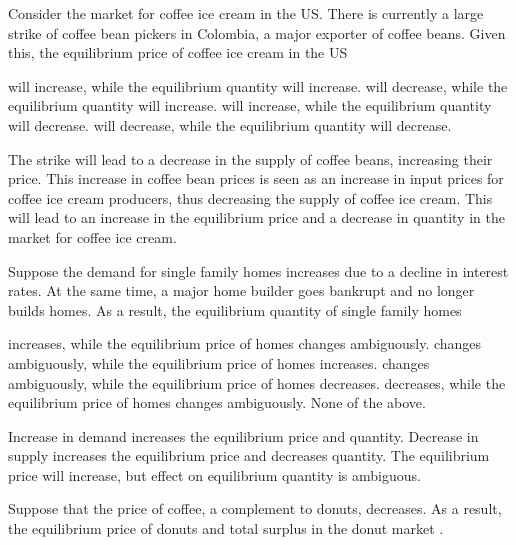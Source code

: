 \documentclass[addpoints,11pt]{exam}
\theoremstyle{definition}
\newcommand{\blank}[0]{\underline{\hspace{3cm}}}
\begin{document}
\begin{questions}
	\question Consider the market for coffee ice cream in the US. There is currently a large strike of coffee bean pickers in Colombia, a major exporter of coffee beans. Given this, the equilibrium price of coffee ice cream in the US
	
	\begin{choices}
		\choice will increase, while the equilibrium quantity will increase.
		\choice will decrease, while the equilibrium quantity will increase.
		\CorrectChoice will increase, while the equilibrium quantity will decrease.
		\choice will decrease, while the equilibrium quantity will decrease.
	\end{choices}
	
	\begin{solution}
		The strike will lead to a decrease in the supply of coffee beans, increasing their price. This increase in coffee bean prices is seen as an increase in input prices for coffee ice cream producers, thus decreasing the supply of coffee ice cream. This will lead to an increase in the equilibrium price and a decrease in quantity in the market for coffee ice cream.
	\end{solution}
			
		\question Suppose the demand for single family homes increases due to a decline in interest rates. At the same time, a major home builder goes bankrupt and no longer builds homes. As a result, the equilibrium quantity of single family homes
		
		\begin{choices}
			\choice increases, while the equilibrium price of homes changes ambiguously.
			\CorrectChoice changes ambiguously, while the equilibrium price of homes increases.
			\choice changes ambiguously, while the equilibrium price of homes decreases.
			\choice decreases, while the equilibrium price of homes changes ambiguously.
			\choice None of the above.
		\end{choices}
		
	\begin{solution}
		Increase in demand increases the equilibrium price and quantity. Decrease in supply increases the equilibrium price and decreases quantity. The equilibrium price will increase, but effect on equilibrium quantity is ambiguous.
	\end{solution}
	
	\question Suppose that the price of coffee, a complement to donuts, decreases. As a result, the equilibrium price of donuts \blank and total surplus in the donut market \blank.
	

\end{questions}
\end{document}
